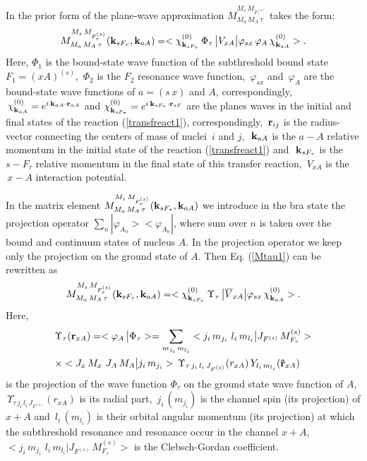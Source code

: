 \documentclass[prl,unsortedaddress,groupedaddress,twocolumn,amsmath,amsfonts,amssymb,showpacs,floatfix,nofootinbib]{revtex4}
\begin{document}
In the prior form of the plane-wave approximation $M_{M_{a}\,M_{A}\,\tau }^{M_{s}\,M_{ F_{\tau}^{(s)}}}$  takes the form:
\begin{align}
M_{M_{a}\,M_{A}\,\tau}^{M_{s}\,M_{F_{\tau}^{(s)}}}({\rm {\bf k}}_{sF_{\tau}},{\rm {\bf k}}_{aA}) = <\chi_{{\rm {\bf k}}_{sF_{\tau}}}^{(0)}\,\Phi_{\tau}\,\big|V_{xA}\big|\varphi_{sx}\,\varphi_{A}\,\chi_{{\rm {\bf k}}_{aA}}^{(0)}>.
\label{Mtau1}
\end{align}
Here, $\Phi_{1}$ is the bound-state wave function of the subthreshold bound state $F_{1}=(xA)^{(s)}$, $\,\Phi_{2}$  is the $F_{2}$ resonance wave function, $\,\varphi_{sx}$ and $\,\varphi_{A}$ are the bound-state wave functions of $a=(s\,x)$ and $A$, correspondingly, $\,\chi_{ {\rm {\bf k}}_{aA} }^{(0) }= e^{ i\,{\rm {\bf k}}_{aA} \cdot {\rm {\bf r}}_{aA} }$ and $\chi_{{\rm {\bf k}}_{sF_{\tau}}}^{(0)} = e^{i\,{\rm {\bf k}}_{sF_{\tau}} \cdot {\rm {\bf r}}_{sF}}$ are the planes waves in the initial and final states of the reaction (\ref{transfreact1}), correspondingly, $\,{\rm {\bf r}}_{ij}$ is the radius-vector connecting  the centers of mass of nuclei $\,i$ and $j$,  $\,\,{\rm {\bf k}}_{aA}$ is  the $a-A$ relative momentum in the initial state of the reaction (\ref{transfreact1})    and  $\,\,{\rm {\bf  k}}_{sF_{\tau}}$ is the $s-F_{\tau}$  relative momentum in the final state of this transfer reaction,  $\,V_{xA}$ is the $\,x-A$ interaction potential.

In the matrix element $M_{M_{a}\,M_{A}\,\tau}^{M_{s}\,M_{F_{\tau}^{(s)}}}({\rm {\bf k}}_{sF_{\tau}},{\rm {\bf k}}_{aA})$ we introduce in the bra state the projection operator $\sum\limits_{n}|\varphi_{A_{n}}><\varphi_{A_{n}}|$, where sum over $n$ is taken over the bound and continuum states of nucleus $A$. In the projection operator we keep only the projection on the ground state of $A$. Then   Eq. (\ref{Mtau1}) can be rewritten as
\begin{align}
M_{M_{a}\,M_{A}\,\tau}^{M_{s}\,M_{F_{\tau}^{(s)}}}({\rm {\bf k}}_{sF_{\tau}},{\rm {\bf k}}_{aA}) = <\chi_{{\rm {\bf k}}_{sF_{\tau}}}^{(0)}\,\Upsilon_{\tau}\,\big|{\overline V}_{xA}\big|\varphi_{sx}\,\chi_{{\rm {\bf k}}_{aA}}^{(0)}>.
\label{Mtau2}
\end{align}
Here,
\begin{align}
&\Upsilon_{\tau}({\rm {\bf r}}_{xA})= <\varphi_{A}\,\big|\Phi_{\tau}> =      \sum\limits_{m_{j_{i}}\,m_{l_{i}} }<j_{i}\,m_{j_{i}}\,\,l_{i}\,m_{l_{i}}\big| J_{F^{(s)}}\,M_{F_{\tau}}^{(s)}>\nonumber\\
& \times<J_{x}\,M_{x}\,\,J_{A}\,M_{A} \big| j_{i}\,m_{j_{i}}>\,\Upsilon_{ \tau\,j_{i}\,l_{i}\,J_{F^{(s)}}}(r_{xA})\,Y_{ l_{i}\,m_{l_{i}} }({\rm {\bf {\hat r}}}_{xA})
\label{Upsilon1}
\end{align}
is the projection of the wave function $\Phi_{\tau}$ on the ground state wave function of $A$,  $\,\Upsilon_{ \tau\,j_{i}\,l_{i}\,J_{F^{(s)}}}(r_{xA})$ is its radial part,  $\,j_{i}\,(m_{j_{i}})$ is the channel spin (its projection) of $x+A$ and $\,l_{i}\,(m_{l_{i}})$ is their orbital angular momentum (its projection) at which the subthreshold  resonance and resonance occur in the channel $x+A$, $<j_{i}\,m_{j_{i}}\,\,l_{i}\,m_{l_{i}}\big| J_{F^{(s)}}\,M_{F_{\tau}}^{(s)}>$ is the Clebsch-Gordan coefficient.
\end{document}
